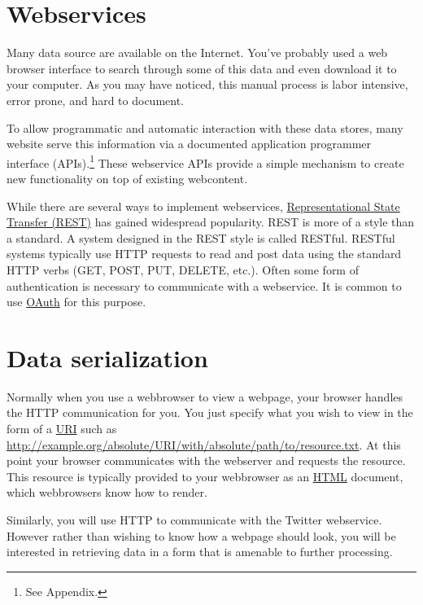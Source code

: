 \section{Webservices}

Many data source are available on the Internet.  You've probably used
a web browser interface to search through some of this data and even
download it to your computer.  As you may have noticed, this manual
process is labor intensive, error prone, and hard to document.

To allow programmatic and automatic interaction with these data stores, many
website serve this information via a documented application programmer
interface (APIs).\footnote{See Appendix.}  These webservice APIs provide a
simple mechanism to create new functionality on top of existing webcontent.

While there are several ways to implement webservices,
\href{http://en.wikipedia.org/wiki/Representational_state_transfer}{Representational
State Transfer (REST)} has gained widespread popularity.  REST is more of a
style than a standard.  A system designed in the REST style is called RESTful.
RESTful systems typically use HTTP requests to read and post data using the
standard HTTP verbs (GET, POST, PUT, DELETE, etc.).  Often some form of
authentication is necessary to communicate with a webservice.  It is common to
use \href{http://en.wikipedia.org/wiki/OAuth}{OAuth} for this purpose.

\section{Data serialization}

Normally when you use a webbrowser to view a webpage, your browser handles
the HTTP communication for you.  You just specify what you wish to view
in the form of a \href{http://en.wikipedia.org/wiki/Uniform_resource_identifier}{URI}
such as \url{http://example.org/absolute/URI/with/absolute/path/to/resource.txt}.
At this point your browser communicates with the webserver and requests the
resource.  This resource is typically provided to your webbrowser as an
\href{http://en.wikipedia.org/wiki/HTML}{HTML} document, which webbrowsers know
how to render.

Similarly, you will use HTTP to communicate with the Twitter webservice. However
rather than wishing to know how a webpage should look, you will be interested
in retrieving data in a form that is amenable to further processing.

